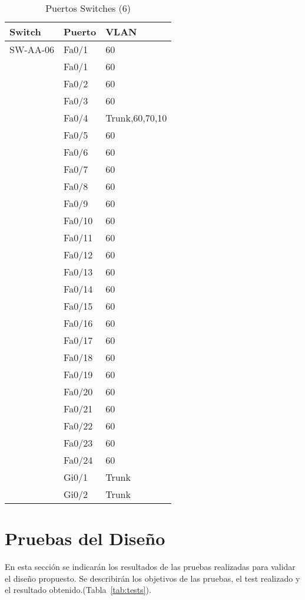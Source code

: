 \documentclass[a4paper,onecolumn,11pt]{article}
\begin{document}
\begin{table}[htbp]
\small \sffamily
\caption{Puertos Switches (6)}
\begin{center}
\begin{tabular}{p{}p{}p{}}
\toprule
\textbf{Switch} & \textbf{Puerto} & \textbf{VLAN}  \\
\toprule
SW-AA-06 & Fa0/1 & 60 \\ %
& Fa0/1 & 60\\
& Fa0/2 & 60\\
& Fa0/3 & 60\\
& Fa0/4 & Trunk,60,70,10\\
& Fa0/5 & 60\\
& Fa0/6 & 60\\
& Fa0/7 & 60\\
& Fa0/8 & 60\\
& Fa0/9 & 60\\
& Fa0/10 & 60\\
& Fa0/11 & 60\\
& Fa0/12 & 60\\
& Fa0/13 & 60\\
& Fa0/14 & 60\\
& Fa0/15 & 60\\
& Fa0/16 & 60\\
& Fa0/17 & 60\\
& Fa0/18 & 60\\
& Fa0/19 & 60\\
& Fa0/20 & 60\\
& Fa0/21 & 60\\
& Fa0/22 & 60\\
& Fa0/23 & 60\\
& Fa0/24 & 60\\
& Gi0/1 & Trunk  \\
& Gi0/2 & Trunk  \\ 
\bottomrule
\end{tabular}
\end{center}
\label{tab:puertos6}
\end{table}

\section{Pruebas del Diseño}

En esta sección se indicarán los resultados de las pruebas realizadas para validar el diseño propuesto. Se describirán los objetivos de las pruebas, el test realizado y el resultado obtenido.(Tabla~\ref{tab:tests}).
\end{document}
